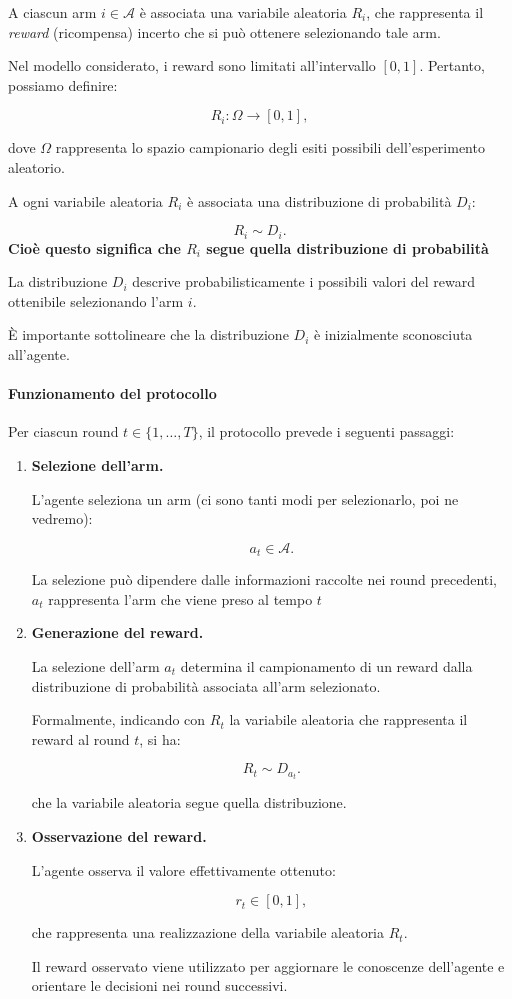 A ciascun arm $i \in \mathcal{A}$ è associata una variabile aleatoria $R_i$, che rappresenta il \textit{reward} (ricompensa) incerto che si può ottenere selezionando tale arm.

Nel modello considerato, i reward sono limitati all'intervallo $[0,1]$. Pertanto, possiamo definire:

\[
R_i : \Omega \longrightarrow [0,1],
\]

dove $\Omega$ rappresenta lo spazio campionario degli esiti possibili dell'esperimento aleatorio.

A ogni variabile aleatoria $R_i$ è associata una distribuzione di probabilità $D_i$:

\[
R_i \sim D_i.
\]
\textbf{Cioè questo significa che $R_i$ segue quella distribuzione di probabilità}


La distribuzione $D_i$ descrive probabilisticamente i possibili valori del reward ottenibile selezionando l'arm $i$.

È importante sottolineare che la distribuzione $D_i$ è inizialmente sconosciuta all'agente.

\paragraph{Funzionamento del protocollo}

Per ciascun round $t \in \{1,\ldots,T\}$, il protocollo prevede i seguenti passaggi:

\begin{enumerate}
    \item \textbf{Selezione dell'arm.}

    L'agente seleziona un arm (ci sono tanti modi per selezionarlo, poi ne vedremo):

    \[
    a_t \in \mathcal{A}.
    \]

    La selezione può dipendere dalle informazioni raccolte nei round precedenti, $a_t$ rappresenta l'arm che viene preso al tempo $t$

    \item \textbf{Generazione del reward.}

    La selezione dell'arm $a_t$ determina il campionamento di un reward dalla distribuzione di probabilità associata all'arm selezionato.

    Formalmente, indicando con $R_t$ la variabile aleatoria che rappresenta il reward al round $t$, si ha:

    \[
    R_t \sim D_{a_t}.
    \]

    che la variabile aleatoria segue quella distribuzione.

    \item \textbf{Osservazione del reward.}

    L'agente osserva il valore effettivamente ottenuto:

    \[
    r_t \in [0,1],
    \]

    che rappresenta una realizzazione della variabile aleatoria $R_t$.

    Il reward osservato viene utilizzato per aggiornare le conoscenze dell'agente e orientare le decisioni nei round successivi.
\end{enumerate}

